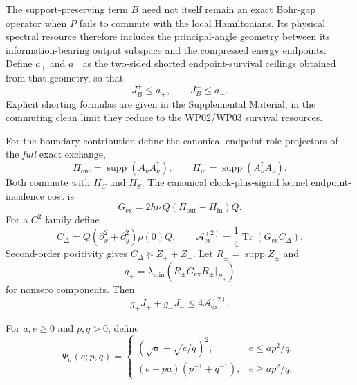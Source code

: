 \documentclass[aps,pra,preprint,nofootinbib]{revtex4-2}
\newcommand{\Tr}{\operatorname{Tr}}
\newcommand{\supp}{\operatorname{supp}}
\newcommand{\Aact}{\mathcal A}
\begin{document}
The support-preserving term $B$ need not itself remain an exact Bohr-gap operator when $P$ fails to commute with the local Hamiltonians.  Its physical spectral resource therefore includes the principal-angle geometry between its information-bearing output subspace and the compressed energy endpoints.  Define $a_+$ and $a_-$ as the two-sided shorted endpoint-survival ceilings obtained from that geometry, so that
\begin{equation}
J_B^+\le a_+,
\qquad
J_B^-\le a_-.
\label{eq:a-ceilings}
\end{equation}
Explicit shorting formulas are given in the Supplemental Material; in the commuting clean limit they reduce to the WP02/WP03 survival resources.

For the boundary contribution define the canonical endpoint-role projectors of the \emph{full} exact exchange,
\begin{equation}
\Pi_{\mathrm{out}}=\supp(A_\nu A_\nu^\dagger),
\qquad
\Pi_{\mathrm{in}}=\supp(A_\nu^\dagger A_\nu).
\label{eq:inout}
\end{equation}
Both commute with $H_C$ and $H_S$.  The canonical clock-plus-signal kernel endpoint-incidence cost is
\begin{equation}
G_{\mathrm{ex}}=2\hbar\nu\,Q(\Pi_{\mathrm{out}}+\Pi_{\mathrm{in}})Q.
\label{eq:Gex}
\end{equation}
For a $C^2$ family define
\begin{equation}
C_\Delta=Q(\partial_x^2+\partial_y^2)\rho(0)Q,
\qquad
\Aact_{\mathrm{ex}}^{(2)}=\frac14\Tr(G_{\mathrm{ex}}C_\Delta).
\label{eq:Aex}
\end{equation}
Second-order positivity gives $C_\Delta\succeq Z_++Z_-$.  Let $R_\pm=\supp Z_\pm$ and
\begin{equation}
g_\pm=\lambda_{\min}\!\left(R_\pm G_{\mathrm{ex}}R_\pm\big|_{R_\pm}\right)
\label{eq:gpm}
\end{equation}
for nonzero components.  Then
\begin{equation}
g_+J_+ +g_-J_-\le4\Aact_{\mathrm{ex}}^{(2)}.
\label{eq:action-budget}
\end{equation}

For $a,e\ge0$ and $p,q>0$, define
\begin{equation}
\Psi_a(e;p,q)=
\begin{cases}
(\sqrt a+\sqrt{e/q})^2,&e\le ap^2/q,\\[1mm]
(e+pa)(p^{-1}+q^{-1}),&e\ge ap^2/q.
\end{cases}
\label{eq:Psi}
\end{equation}
\end{document}

